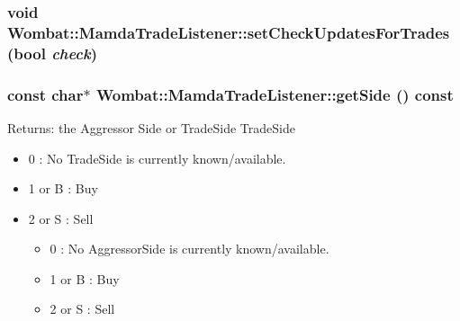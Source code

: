 \hypertarget{classWombat_1_1MamdaTradeListener_fb487bdb0260021c6deb737b7fe49410}{
\subsubsection[setCheckUpdatesForTrades]{\setlength{\rightskip}{0pt plus 5cm}void Wombat::Mamda\-Trade\-Listener::set\-Check\-Updates\-For\-Trades (bool {\em check})}}
\label{classWombat_1_1MamdaTradeListener_fb487bdb0260021c6deb737b7fe49410}


\hypertarget{classWombat_1_1MamdaTradeListener_e3cca817a27a4e6b9e5b699f548cd22a}{
\subsubsection[getSide]{\setlength{\rightskip}{0pt plus 5cm}const char$\ast$ Wombat::Mamda\-Trade\-Listener::get\-Side () const}}
\label{classWombat_1_1MamdaTradeListener_e3cca817a27a4e6b9e5b699f548cd22a}


\begin{Desc}
\item[Returns:]the Aggressor Side or Trade\-Side Trade\-Side \begin{itemize}
\item 0 : No Trade\-Side is currently known/available. \item 1 or B : Buy \item 2 or S : Sell \begin{itemize}
\end{itemize}
\begin{itemize}
\item 0 : No Aggressor\-Side is currently known/available. \item 1 or B : Buy \item 2 or S : Sell \begin{itemize}
\end{itemize}
\end{itemize}
\end{itemize}
\end{Desc}


